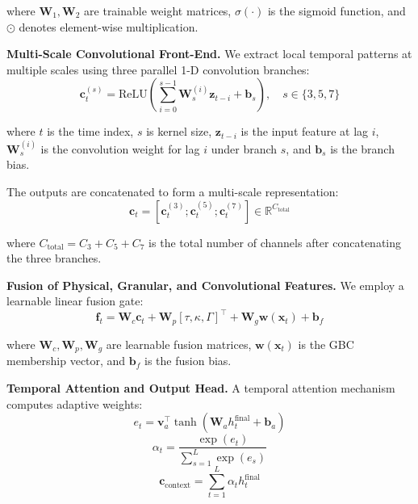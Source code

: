 \documentclass[11pt]{article}
\begin{document}
where $\mathbf{W}_1,\mathbf{W}_2$ are trainable weight matrices, $\sigma(\cdot)$ is the sigmoid function, and $\odot$ denotes element-wise multiplication.

\medskip
\par\noindent\hspace*{2em}\textbf{Multi-Scale Convolutional Front-End.} We extract local temporal patterns at multiple scales using three parallel 1-D convolution branches:
\begin{equation}
\mathbf{c}_t^{(s)} = \text{ReLU}\left( \sum_{i=0}^{s-1} \mathbf{W}_s^{(i)} \mathbf{z}_{t-i} + \mathbf{b}_s \right), \quad s \in \{3, 5, 7\}
\end{equation}

where $t$ is the time index, $s$ is kernel size, $\mathbf{z}_{t-i}$ is the input feature at lag $i$, $\mathbf{W}_s^{(i)}$ is the convolution weight for lag $i$ under branch $s$, and $\mathbf{b}_s$ is the branch bias.

The outputs are concatenated to form a multi-scale representation:
\begin{equation}
\mathbf{c}_t = [\mathbf{c}_t^{(3)}; \mathbf{c}_t^{(5)}; \mathbf{c}_t^{(7)}] \in \mathbb{R}^{C_{\text{total}}}
\end{equation}

where $C_{\text{total}}=C_3+C_5+C_7$ is the total number of channels after concatenating the three branches.

\medskip
\par\noindent\hspace*{2em}\textbf{Fusion of Physical, Granular, and Convolutional Features.} We employ a learnable linear fusion gate:
\begin{equation}
\mathbf{f}_t = \mathbf{W}_c \mathbf{c}_t + \mathbf{W}_p [\tau, \kappa, \Gamma]^\top + \mathbf{W}_g \mathbf{w}(\mathbf{x}_t) + \mathbf{b}_f
\end{equation}

where $\mathbf{W}_c,\mathbf{W}_p,\mathbf{W}_g$ are learnable fusion matrices, $\mathbf{w}(\mathbf{x}_t)$ is the GBC membership vector, and $\mathbf{b}_f$ is the fusion bias.

\medskip
\par\noindent\hspace*{2em}\textbf{Temporal Attention and Output Head.} A temporal attention mechanism computes adaptive weights:
\begin{equation}
e_t = \mathbf{v}_a^\top \tanh(\mathbf{W}_a h_t^{\text{final}} + \mathbf{b}_a)
\end{equation}
\begin{equation}
\alpha_t = \frac{\exp(e_t)}{\sum_{s=1}^L \exp(e_s)}
\end{equation}
\begin{equation}
\mathbf{c}_{\text{context}} = \sum_{t=1}^L \alpha_t h_t^{\text{final}}
\end{equation}
\end{document}
